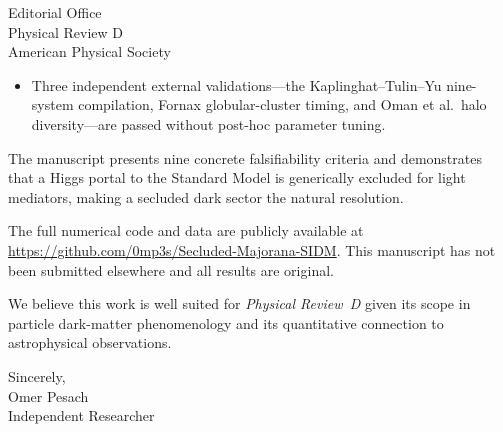 \documentclass[11pt]{letter}
\begin{document}
\begin{letter}{%
  Editorial Office \\
  Physical Review D \\
  American Physical Society
}
\begin{itemize}
  \item Three independent external validations---the Kaplinghat--Tulin--Yu
        nine-system compilation, Fornax globular-cluster timing, and
        Oman et al.\ halo diversity---are passed without post-hoc
        parameter tuning.
\end{itemize}

The manuscript presents nine concrete falsifiability criteria and
demonstrates that a Higgs portal to the Standard Model is generically
excluded for light mediators, making a secluded dark sector the
natural resolution.

The full numerical code and data are publicly available at
\url{https://github.com/0mp3s/Secluded-Majorana-SIDM}.
This manuscript has not been submitted elsewhere and all results are
original.

We believe this work is well suited for \textit{Physical Review~D}
given its scope in particle dark-matter phenomenology and its
quantitative connection to astrophysical observations.

\closing{Sincerely,\\[6pt] Omer Pesach \\ Independent Researcher}

\end{letter}
\end{document}

